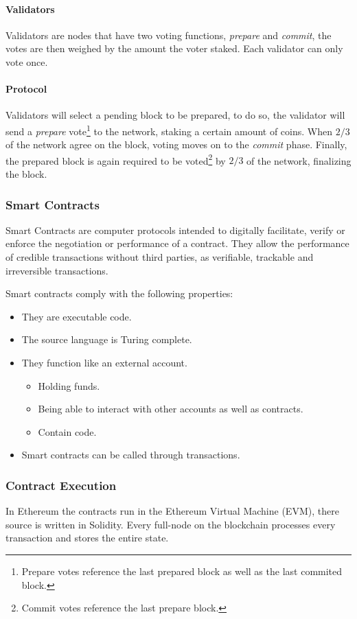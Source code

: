 \paragraph{Validators}
Validators are nodes that have two voting functions, \textit{prepare} and \textit{commit},
the votes are then weighed by the amount the voter staked.
Each validator can only vote once.

\paragraph{Protocol}
Validators will select a pending block to be prepared,
to do so, the validator will send a \textit{prepare} vote\footnote{Prepare votes reference the last prepared block as well as the last commited block.} to the network,
staking a certain amount of coins.
When $2/3$ of the network agree on the block, voting moves on to the \textit{commit} phase.
Finally, the prepared block is again required to be voted\footnote{Commit votes reference the last prepare block.} by $2/3$ of the network, finalizing the block.

\subsubsection{Smart Contracts}
Smart Contracts are computer protocols intended to digitally facilitate,
verify or enforce the negotiation or performance of a contract.
They allow the performance of credible transactions without third parties,
as verifiable, trackable and irreversible transactions.

Smart contracts comply with the following properties:
\begin{itemize}
    \item They are executable code.
    \item The source language is Turing complete.
    \item They function like an external account.
    \begin{itemize}
        \item Holding funds.
        \item Being able to interact with other accounts as well as contracts.
        \item Contain code.
    \end{itemize}
    \item Smart contracts can be called through transactions.
\end{itemize}

\subsubsection{Contract Execution}
In Ethereum the contracts run in the Ethereum Virtual Machine (EVM),
there source is written in Solidity.
Every full-node on the blockchain processes every transaction and stores the entire state.


